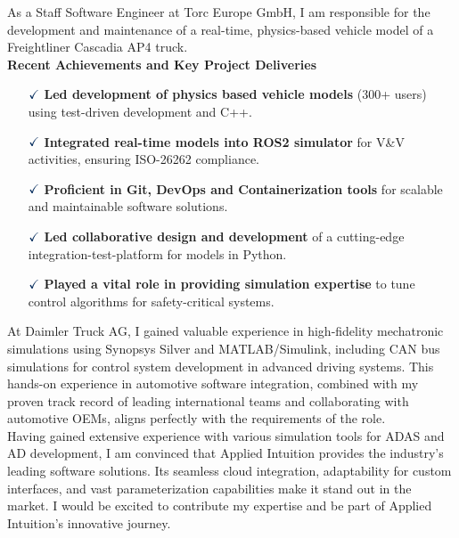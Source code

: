 \documentclass[a4paper,10pt]{article}
\begin{document}
\noindent As a Staff Software Engineer at Torc Europe GmbH, I am responsible
for the development and maintenance of a real-time, physics-based vehicle model
of a Freightliner Cascadia AP4 truck.\\

\noindent \textbf{Recent Achievements and Key Project Deliveries}
\vspace{0.1cm}
\begin{itemize}
    \item[$\textcolor{highlightcolor}{\checkmark}$] \textcolor{highlightcolor}{\textbf{Led development of physics based vehicle models}} (300+ users) using test-driven development and C++.
    \item[$\textcolor{highlightcolor}{\checkmark}$] \textcolor{highlightcolor}{\textbf{Integrated real-time models into ROS2 simulator}} for V\&V activities, ensuring ISO-26262 compliance.
    \item[$\textcolor{highlightcolor}{\checkmark}$] \textcolor{highlightcolor}{\textbf{Proficient in Git, DevOps and Containerization tools}} for scalable and maintainable software solutions.
    \item[$\textcolor{highlightcolor}{\checkmark}$] \textcolor{highlightcolor}{\textbf{Led collaborative design and development}} of a cutting-edge integration-test-platform for models in Python.
    \item[$\textcolor{highlightcolor}{\checkmark}$] \textcolor{highlightcolor}{\textbf{Played a vital role in providing simulation expertise}} to tune control algorithms for safety-critical systems.
\end{itemize}

\noindent At Daimler Truck AG, I gained valuable experience in high-fidelity
mechatronic simulations using Synopsys Silver and MATLAB/Simulink, including
CAN bus simulations for control system development in advanced driving systems.
This hands-on experience in automotive software integration, combined with my
proven track record of leading international teams and collaborating with
automotive OEMs, aligns perfectly with the requirements of the role.\\

\noindent Having gained extensive experience with various simulation tools for
ADAS and AD development, I am convinced that Applied Intuition provides the
industry’s leading software solutions. Its seamless cloud integration,
adaptability for custom interfaces, and vast parameterization capabilities make
it stand out in the market. I would be excited to contribute my expertise and
be part of Applied Intuition’s innovative journey.\\
\end{document}
